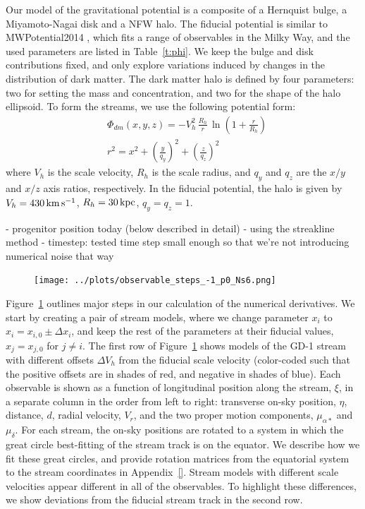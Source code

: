 \documentclass[modern]{aastex61}
\begin{document}
Our model of the gravitational potential is a composite of a Hernquist bulge, a Miyamoto-Nagai disk and a NFW halo.
The fiducial potential is similar to MWPotential2014 \citep{galpy}, which fits a range of observables in the Milky Way, and the used parameters are listed in Table~\ref{t:phi}.
We keep the bulge and disk contributions fixed, and only explore variations induced by changes in the distribution of dark matter.
The dark matter halo is defined by four parameters: two for setting the mass and concentration, and two for the shape of the halo ellipsoid.
To form the streams, we use the following potential form:
\begin{equation}
\begin{aligned}
& \Phi_{dm}(x, y, z) = -V_h^2\, \frac{R_h}{r}\, \ln\left(1 + \frac{r}{R_h}\right) \\
& r^2 = x^2 + \left(\frac{y}{q_y}\right)^2 + \left(\frac{z}{q_z}\right)^2
\end{aligned}
\label{eq:nfw}
\end{equation}
where $V_h$ is the scale velocity, $R_h$ is the scale radius, and $q_y$ and $q_z$ are the $x/y$ and $x/z$ axis ratios, respectively.
In the fiducial potential, the halo is given by $V_h = 430\,\rm km\,s^{-1}$, $R_h = 30\,\rm kpc$, $q_y = q_z = 1$.

- progenitor position today (below described in detail)
- using the streakline method \citep{bonaca}
- timestep: tested time step small enough so that we're not introducing numerical noise that way

\begin{figure}
\begin{center}
\texttt{[image: ../plots/observable\_steps\_-1\_p0\_Ns6.png]}
\caption{
}
\label{fig:derivative_steps}
\end{center}
\end{figure}

Figure~\ref{fig:derivative_steps} outlines major steps in our calculation of the numerical derivatives.
We start by creating a pair of stream models, where we change parameter $x_i$ to $x_i = x_{i,0} \pm \Delta x_i$, and keep the rest of the parameters at their fiducial values, $x_j = x_{j,0}$ for $j\neq i$.
The first row of Figure~\ref{fig:derivative_steps} shows models of the GD-1 stream with different offsets $\Delta V_{h}$ from the fiducial scale velocity (color-coded such that the positive offsets are in shades of red, and negative in shades of blue).
Each observable is shown as a function of longitudinal position along the stream, $\xi$, in a separate column in the order from left to right: transverse on-sky position, $\eta$, distance, $d$, radial velocity, $V_r$, and the two proper motion components, $\mu_{\alpha*}$ and $\mu_\delta$.
For each stream, the on-sky positions are rotated to a system in which the great circle best-fitting of the stream track is on the equator.
We describe how we fit these great circles, and provide rotation matrices from the equatorial system to the stream coordinates in Appendix~\ref{}.
Stream models with different scale velocities appear different in all of the observables.
To highlight these differences, we show deviations from the fiducial stream track in the second row.
\end{document}
